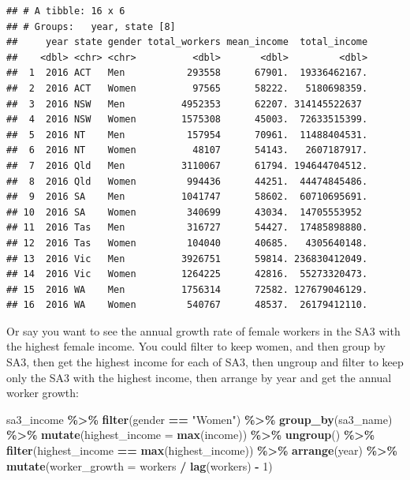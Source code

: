 \documentclass[
]{book}
\newenvironment{Shaded}{\begin{snugshade}}{\end{snugshade}}
\newcommand{\DataTypeTok}[1]{\textcolor[rgb]{0.13,0.29,0.53}{#1}}
\newcommand{\DecValTok}[1]{\textcolor[rgb]{0.00,0.00,0.81}{#1}}
\newcommand{\KeywordTok}[1]{\textcolor[rgb]{0.13,0.29,0.53}{\textbf{#1}}}
\newcommand{\NormalTok}[1]{#1}
\newcommand{\OperatorTok}[1]{\textcolor[rgb]{0.81,0.36,0.00}{\textbf{#1}}}
\newcommand{\StringTok}[1]{\textcolor[rgb]{0.31,0.60,0.02}{#1}}
\begin{document}
\begin{verbatim}
## # A tibble: 16 x 6
## # Groups:   year, state [8]
##     year state gender total_workers mean_income  total_income
##    <dbl> <chr> <chr>          <dbl>       <dbl>         <dbl>
##  1  2016 ACT   Men           293558      67901.  19336462167.
##  2  2016 ACT   Women          97565      58222.   5180698359.
##  3  2016 NSW   Men          4952353      62207. 314145522637 
##  4  2016 NSW   Women        1575308      45003.  72633515399.
##  5  2016 NT    Men           157954      70961.  11488404531.
##  6  2016 NT    Women          48107      54143.   2607187917.
##  7  2016 Qld   Men          3110067      61794. 194644704512.
##  8  2016 Qld   Women         994436      44251.  44474845486.
##  9  2016 SA    Men          1041747      58602.  60710695691.
## 10  2016 SA    Women         340699      43034.  14705553952 
## 11  2016 Tas   Men           316727      54427.  17485898880.
## 12  2016 Tas   Women         104040      40685.   4305640148.
## 13  2016 Vic   Men          3926751      59814. 236830412049.
## 14  2016 Vic   Women        1264225      42816.  55273320473.
## 15  2016 WA    Men          1756314      72582. 127679046129.
## 16  2016 WA    Women         540767      48537.  26179412110.
\end{verbatim}

Or say you want to see the annual growth rate of female workers in the SA3 with the highest female income. You could filter to keep women, and then group by SA3, then get the highest income for each of SA3, then ungroup and filter to keep only the SA3 with the highest income, then arrange by year and get the annual worker growth:

\begin{Shaded}
\begin{Highlighting}[]
\NormalTok{sa3\_income }\OperatorTok{\%\textgreater{}\%}\StringTok{ }
\StringTok{  }\KeywordTok{filter}\NormalTok{(gender }\OperatorTok{==}\StringTok{ "Women"}\NormalTok{) }\OperatorTok{\%\textgreater{}\%}\StringTok{ }
\StringTok{  }\KeywordTok{group\_by}\NormalTok{(sa3\_name) }\OperatorTok{\%\textgreater{}\%}\StringTok{ }
\StringTok{  }\KeywordTok{mutate}\NormalTok{(}\DataTypeTok{highest\_income =} \KeywordTok{max}\NormalTok{(income)) }\OperatorTok{\%\textgreater{}\%}\StringTok{ }
\StringTok{  }\KeywordTok{ungroup}\NormalTok{() }\OperatorTok{\%\textgreater{}\%}\StringTok{ }
\StringTok{  }\KeywordTok{filter}\NormalTok{(highest\_income }\OperatorTok{==}\StringTok{ }\KeywordTok{max}\NormalTok{(highest\_income)) }\OperatorTok{\%\textgreater{}\%}\StringTok{ }
\StringTok{  }\KeywordTok{arrange}\NormalTok{(year) }\OperatorTok{\%\textgreater{}\%}\StringTok{ }
\StringTok{  }\KeywordTok{mutate}\NormalTok{(}\DataTypeTok{worker\_growth =}\NormalTok{ workers }\OperatorTok{/}\StringTok{ }\KeywordTok{lag}\NormalTok{(workers) }\OperatorTok{{-}}\StringTok{ }\DecValTok{1}\NormalTok{)}
\end{Highlighting}
\end{Shaded}
\end{document}
